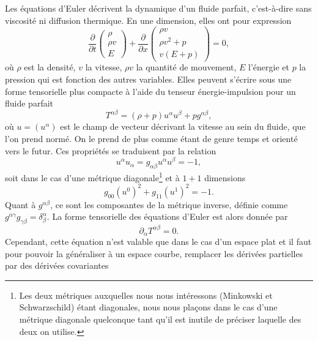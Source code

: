 \documentclass[11pt,a4paper]{article}
\begin{document}
Les équations d'Euler décrivent la dynamique d'un fluide parfait, c'est-à-dire sans viscosité ni diffusion thermique. En une dimension, elles ont pour expression
\begin{equation}
	\frac{\partial}{\partial t} \begin{pmatrix}
 \rho \\
 \rho v \\
 E 
 \end{pmatrix} + \frac{\partial}{\partial x} \begin{pmatrix}
 \rho v \\
 \rho v^2 + p\\
 v \left(E + p\right) 
 \end{pmatrix} = 0,
\end{equation}
où $\rho$ est la densité, $v$ la vitesse, $\rho v$ la quantité de mouvement, $E$ l'énergie et $p$ la pression qui est fonction des autres variables. Elles peuvent s'écrire sous une forme tensorielle plus compacte à l'aide du tenseur énergie-impulsion pour un fluide parfait
\begin{equation}\label{tenseur_energie_impulsion_definition}
	T^{\alpha\beta} = \left(\rho + p\right) u^\alpha u^\beta + p g^{\alpha\beta},
\end{equation}
où $u =  (u^\alpha)$ est le champ de vecteur décrivant la vitesse au sein du fluide, que l'on prend normé. On le prend de plus comme étant de genre temps et orienté vers le futur. Ces propriétés se traduisent par la relation 
\begin{equation}
	u^\alpha u_\alpha = g_{\alpha\beta} u^\alpha u^\beta = -1,
\end{equation}
soit dans le cas d'une métrique diagonale\footnote{Les deux métriques auxquelles nous nous intéressons (Minkowski et Schwarzschild) étant diagonales, nous nous plaçons dans le cas d'une métrique diagonale quelconque tant qu'il est inutile de préciser laquelle des deux on utilise.} et à $1 + 1$ dimensions
\begin{equation}
	g_{00}(u^0)^2 + g_{11}(u^1)^2 = -1.
\end{equation}
Quant à $g^{\alpha\beta}$, ce sont les composantes de la métrique inverse, définie comme $g^{\alpha\gamma}g_{\gamma\beta} = \delta^\alpha_\beta$.
La forme tensorielle des équations d'Euler est alors donnée par
\begin{equation}
	\partial_\alpha T^{\alpha\beta} = 0.
\end{equation}
Cependant, cette équation n'est valable que dans le cas d'un espace plat et il faut pour pouvoir la généraliser à un espace courbe, remplacer les dérivées partielles par des dérivées covariantes
\end{document}
